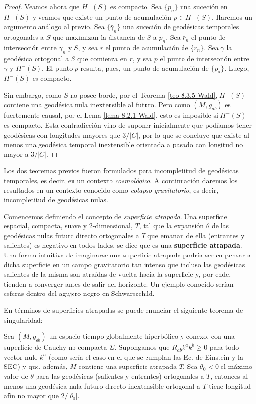 \begin{proof}
Veamos ahora que $H^-(S)$ es compacto. Sea $\{p_n\}$ una suceción en $H^-(S)$ y veamos que existe un punto de acumulación $p\in H^-(S)$. Haremos un argumento análogo al previo. Sea $\{\bar\gamma_n\}$ una suceción de geodésicas temporales ortogonales a $S$ que maximizan la distancia de $S$ a $p_n$. Sea $\bar{r}_n$ el punto de intersección entre $\bar\gamma_n$ y $S$, y sea $\bar{r}$ el punto de acumulación de $\{\bar{r}_n\}$. Sea $\bar{\gamma}$ la geodésica ortogonal a $S$ que comienza en $\bar{r}$, y sea $p$ el punto de intersección entre $\bar{\gamma}$ y $H^-(S)$. El punto $p$ resulta, pues, un punto de acumulación de $\{p_n\}$. Luego, $H^-(S)$ es compacto.

Sin embargo, como $S$ no posee borde, por el Teorema \ref{teo 8.3.5 Wald}, $H^-(S)$ contiene una geodésica nula inextensible al futuro. Pero como $(M,g_{ab})$ es fuertemente causal, por el Lema \ref{lema 8.2.1 Wald}, esto es imposible si $H^-(S)$ es compacto. Esta contradicción vino de suponer inicialmente que podíamos tener geodésicas con longitudes mayores que $3/|C|$, por lo que se concluye que existe al menos una geodésica temporal inextensible orientada a pasado con longitud no mayor a $3/|C|$.
\end{proof}


Los dos teoremas previos fueron formulados para incompletitud de geodésicas temporales, es decir, en un contexto \textit{cosmológico}. A continuación daremos los resultados en un contexto conocido como \textit{colapso gravitatorio}, es decir, incompletitud de geodésicas nulas.

Comencemos definiendo el concepto de \textit{superficie atrapada}. Una superficie espacial, compacta, suave y 2-dimensional, $T$, tal que la expansión $\theta$ de las geodésicas nulas futuro directo ortogonales a $T$ que emanan de ella (entrantes y salientes) es negativo en todos lados, se dice que es una \textbf{superficie atrapada}. Una forma intuitiva de imaginarse una superficie atrapada podría ser en pensar a dicha superficie en un campo gravitatorio tan intenso que incluso las geodésicas salientes de la misma son atraídas de vuelta hacia la superficie y, por ende, tienden a converger antes de salir del horizonte. Un ejemplo conocido serían esferas dentro del agujero negro en Schwarszchild.

En términos de superficies atrapadas se puede enunciar el siguiente teorema de singularidad:

\begin{theorem}\label{sing nulas}
Sea $(M,g_{ab})$ un espacio-tiempo globalmente hiperbólico y conexo, con una superficie de Cauchy no-compacta $\Sigma$. Supongamos que $R_{ab}k^ak^b\geq0$ para todo vector nulo $k^a$ (como sería el caso en el que se cumplan las Ec. de Einstein y la SEC) y que, además, $M$ contiene una superficie atrapada $T$. Sea $\theta_0<0$ el máximo valor de $\theta$ para las geodésicas (salientes y entrantes) ortogonales a $T$, entonces al menos una geodésica nula futuro directo inextensible ortogonal a $T$ tiene longitud afín no mayor que $2/|\theta_0|$.
\end{theorem}

